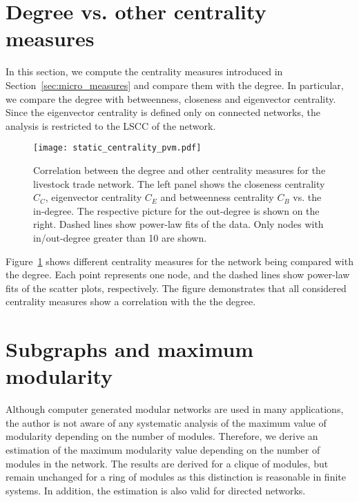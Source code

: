 \section{Degree vs. other centrality measures}\label{sec:centrality_hit}
In this section, we compute the centrality measures introduced in Section~\ref{sec:micro_measures} and compare them with the degree.
In particular, we compare the degree with betweenness, closeness and eigenvector centrality.
Since the eigenvector centrality is defined only on connected networks, the analysis is restricted to the LSCC of the network.
%
\begin{figure}[htb]
\begin{center}
\texttt{[image: static\_centrality\_pvm.pdf]}
\caption{Correlation between the degree and other centrality measures for the livestock trade network.
The left panel shows the closeness centrality $C_C$, eigenvector centrality $C_E$ and betweenness centrality $C_B$ vs. the in-degree.
The respective picture for the out-degree is shown on the right.
Dashed lines show power-law fits of the data.
Only nodes with in/out-degree greater than 10 are shown.}
\label{fig:centrality_pvm}
\end{center}
\end{figure}
%
Figure~\ref{fig:centrality_pvm} shows different centrality measures for the network being compared with the degree.
Each point represents one node, and the dashed lines show power-law fits of the scatter plots, respectively.
The figure demonstrates that all considered centrality measures show a correlation with the the degree.

\section{Subgraphs and maximum modularity}\label{sec:maximum_modularity_subgraphs}
Although computer generated modular networks are used in many applications, the author is not aware of any systematic analysis of the maximum value of modularity depending on the number of modules.
Therefore, we derive an estimation of the maximum modularity value depending on the number of modules in the network.
The results are derived for a clique of modules, but remain unchanged for a ring of modules as this distinction is reasonable in finite systems.
In addition, the estimation is also valid for directed networks.

